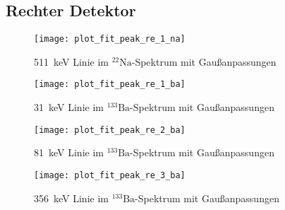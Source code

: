 \documentclass[11pt, ngerman, fleqn, DIV=15, headinclude, BCOR=2cm]{scrreprt}
\begin{document}
\begin{appendix}
\subsection{Rechter Detektor}
\begin{figure}[h]
    \centering
    \texttt{[image: plot\_fit\_peak\_re\_1\_na]}
    \caption{%
	    \SI{511}{\kilo\electronvolt} Linie im $^{22}\text{Na}$-Spektrum mit
	    Gaußanpassungen
   }
    \label{fig:plot_fit_peak_re_1_Na}
\end{figure}
\begin{figure}[h]
    \centering
    \texttt{[image: plot\_fit\_peak\_re\_1\_ba]}
    \caption{%
	    \SI{31}{\kilo\electronvolt} Linie im $^{133}\text{Ba}$-Spektrum mit
	    Gaußanpassungen
   }
    \label{fig:plot_fit_peak_re_1_Ba}
\end{figure}
\begin{figure}[h]
    \centering
    \texttt{[image: plot\_fit\_peak\_re\_2\_ba]}
    \caption{%
	    \SI{81}{\kilo\electronvolt} Linie im $^{133}\text{Ba}$-Spektrum mit
	    Gaußanpassungen
   }
    \label{fig:plot_fit_peak_re_2_Ba}
\end{figure}
\begin{figure}[h]
    \centering
    \texttt{[image: plot\_fit\_peak\_re\_3\_ba]}
    \caption{%
	    \SI{356}{\kilo\electronvolt} Linie im $^{133}\text{Ba}$-Spektrum mit
	    Gaußanpassungen
   }
    \label{fig:plot_fit_peak_re_3_Ba}
\end{figure}
\clearpage


\end{appendix}
\end{document}
